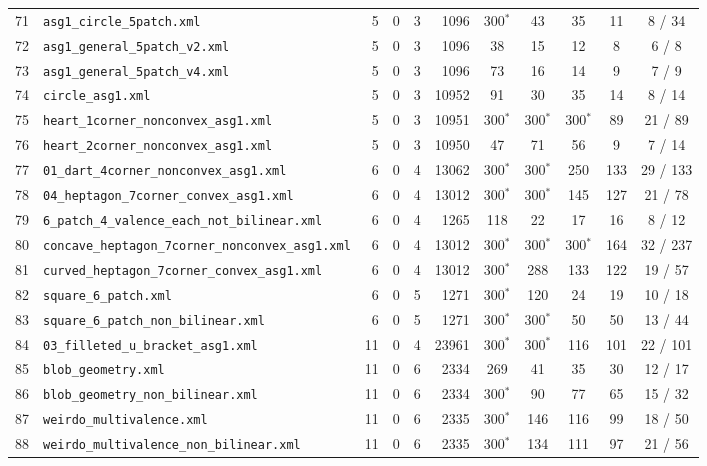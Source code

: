 \documentclass[10pt,a4paper]{article}
\begin{document}
{\begin{longtable}{@{}rlrrrrccccc@{}}
71 & \texttt{asg1\_circle\_5patch.xml} & 5 & 0 & 3 & 1096 & 300$^*$ & 43 & 35 & 11 & 8 / 34 \\
72 & \texttt{asg1\_general\_5patch\_v2.xml} & 5 & 0 & 3 & 1096 & 38 & 15 & 12 & 8 & 6 / 8 \\
73 & \texttt{asg1\_general\_5patch\_v4.xml} & 5 & 0 & 3 & 1096 & 73 & 16 & 14 & 9 & 7 / 9 \\
74 & \texttt{circle\_asg1.xml} & 5 & 0 & 3 & 10952 & 91 & 30 & 35 & 14 & 8 / 14 \\
75 & \texttt{heart\_1corner\_nonconvex\_asg1.xml} & 5 & 0 & 3 & 10951 & 300$^*$ & 300$^*$ & 300$^*$ & 89 & 21 / 89 \\
76 & \texttt{heart\_2corner\_nonconvex\_asg1.xml} & 5 & 0 & 3 & 10950 & 47 & 71 & 56 & 9 & 7 / 14 \\
77 & \texttt{01\_dart\_4corner\_nonconvex\_asg1.xml} & 6 & 0 & 4 & 13062 & 300$^*$ & 300$^*$ & 250 & 133 & 29 / 133 \\
78 & \texttt{04\_heptagon\_7corner\_convex\_asg1.xml} & 6 & 0 & 4 & 13012 & 300$^*$ & 300$^*$ & 145 & 127 & 21 / 78 \\
79 & \texttt{6\_patch\_4\_valence\_each\_not\_bilinear.xml} & 6 & 0 & 4 & 1265 & 118 & 22 & 17 & 16 & 8 / 12 \\
80 & \texttt{concave\_heptagon\_7corner\_nonconvex\_asg1.xml} & 6 & 0 & 4 & 13012 & 300$^*$ & 300$^*$ & 300$^*$ & 164 & 32 / 237 \\
81 & \texttt{curved\_heptagon\_7corner\_convex\_asg1.xml} & 6 & 0 & 4 & 13012 & 300$^*$ & 288 & 133 & 122 & 19 / 57 \\
82 & \texttt{square\_6\_patch.xml} & 6 & 0 & 5 & 1271 & 300$^*$ & 120 & 24 & 19 & 10 / 18 \\
83 & \texttt{square\_6\_patch\_non\_bilinear.xml} & 6 & 0 & 5 & 1271 & 300$^*$ & 300$^*$ & 50 & 50 & 13 / 44 \\
84 & \texttt{03\_filleted\_u\_bracket\_asg1.xml} & 11 & 0 & 4 & 23961 & 300$^*$ & 300$^*$ & 116 & 101 & 22 / 101 \\
85 & \texttt{blob\_geometry.xml} & 11 & 0 & 6 & 2334 & 269 & 41 & 35 & 30 & 12 / 17 \\
86 & \texttt{blob\_geometry\_non\_bilinear.xml} & 11 & 0 & 6 & 2334 & 300$^*$ & 90 & 77 & 65 & 15 / 32 \\
87 & \texttt{weirdo\_multivalence.xml} & 11 & 0 & 6 & 2335 & 300$^*$ & 146 & 116 & 99 & 18 / 50 \\
88 & \texttt{weirdo\_multivalence\_non\_bilinear.xml} & 11 & 0 & 6 & 2335 & 300$^*$ & 134 & 111 & 97 & 21 / 56 \\

\end{longtable}}
\end{document}
